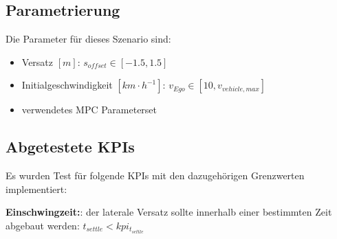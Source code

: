 \subsection{Parametrierung}
Die Parameter für dieses Szenario sind:
\begin{itemize}
    \item Versatz $[m]$: $s_{offset} \in [-1.5,1.5]$ 
    \item Initialgeschwindigkeit $[km\cdot h^{-1}]$: $v_{Ego} \in [10,v_{vehicle,max}]$
    \item verwendetes MPC Parameterset 
\end{itemize}

\subsection{Abgetestete KPIs}
Es wurden Test für folgende KPIs mit den dazugehörigen Grenzwerten implementiert:

\medskip\noindent\textbf{Einschwingzeit:}: der laterale Versatz sollte innerhalb einer bestimmten Zeit abgebaut werden: $t_{settle} < kpi_{t_{settle}}$

